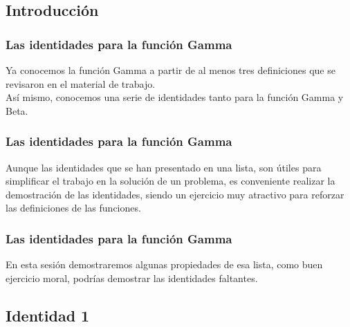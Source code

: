 \documentclass[12pt]{beamer}
\begin{document}
\subsection{Introducción}
\begin{frame}
\frametitle{Las identidades para la función Gamma}
Ya conocemos la función Gamma a partir de al menos tres definiciones que se revisaron en el material de trabajo.
\\
\bigskip
\pause
Así mismo, conocemos una serie de identidades tanto para la función Gamma y Beta.
\end{frame}
\begin{frame}
\frametitle{Las identidades para la función Gamma}
Aunque las identidades que se han presentado en una lista, son útiles para simplificar el trabajo en la solución de un problema, es conveniente realizar la demostración de las identidades, siendo un ejercicio muy atractivo para reforzar las definiciones de las funciones.
\end{frame}
\begin{frame}
\frametitle{Las identidades para la función Gamma}
En esta sesión demostraremos algunas propiedades de esa lista, como buen ejercicio moral, podrías demostrar las identidades faltantes.
\end{frame}

\subsection{Identidad 1}
\end{document}
